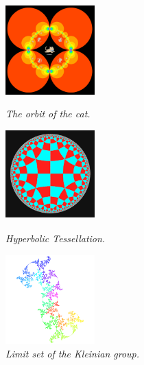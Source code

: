 \begin{figure}[htbp]
 \begin{minipage}[t]{0.3333\hsize}
  \center
  \includegraphics[height=1.35in, keepaspectratio]{img/preparation/basic/catCircleOrbit.png}
  \caption{\textit{The orbit of the cat.}}
  \label{fig:orbitCat}
  \hspace*{\fill}
 \end{minipage}
 \begin{minipage}[t]{0.3333\hsize}
  \center
  \includegraphics[height=1.35in, keepaspectratio]{img/preparation/basic/hyperbolicTessellation.png}
  \caption{\textit{Hyperbolic Tessellation.}}
  \label{fig:hypTiling}
  \hspace*{\fill}
 \end{minipage}
 \begin{minipage}[t]{0.3333\hsize}
  \center
  \includegraphics[height=1.35in, keepaspectratio]{img/preparation/limitSet/limit.png}
  \caption{\textit{Limit set of the Kleinian group.}}
  \label{fig:limit}
  \hspace*{\fill}
 \end{minipage}
\end{figure}

